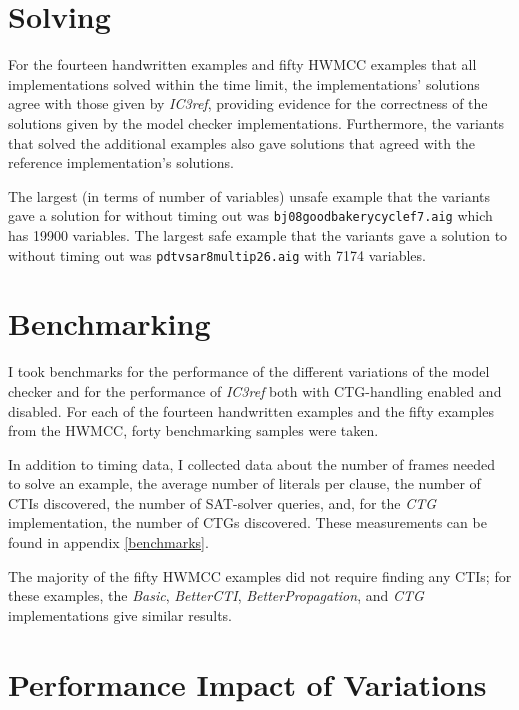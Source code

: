 \documentclass[12pt,a4paper,twoside,openright]{report}
\begin{document}
{\section{Solving}
\label{eval:solving}

For the fourteen handwritten examples and fifty HWMCC examples that all implementations solved
within the time limit, the
implementations' solutions agree with those given by \emph{IC3ref}, providing evidence for the correctness of the solutions given by the model checker
implementations. Furthermore, the variants that solved the additional examples also gave
solutions that agreed with the reference implementation's solutions.

The largest (in terms of number of variables) unsafe example that the variants gave a solution
for without timing out was \verb,bj08goodbakerycyclef7.aig, which has 19900 variables.
The largest safe example that the variants gave a solution
to without timing out was \verb,pdtvsar8multip26.aig, with 7174 variables.

\section{Benchmarking}
\label{eval:benchmarking}
I took benchmarks for the performance of the different variations of the model checker and for the
performance of \emph{IC3ref} both with CTG-handling enabled and disabled. For each of the fourteen handwritten examples and the fifty examples from the HWMCC, forty benchmarking samples were taken.

In addition to timing data, I collected data about the number of frames needed to solve an example,
the average number of literals per clause, the number of CTIs discovered, the number of SAT-solver queries,
and, for the \emph{CTG} implementation, the number of CTGs discovered. These measurements can be found in
appendix \ref{benchmarks}.

The majority of the fifty HWMCC examples did not require finding any
CTIs; for these examples, the \emph{Basic}, \emph{BetterCTI}, \emph{BetterPropagation},
and \emph{CTG} implementations give similar results. 

\section{Performance Impact of Variations}
\label{eval:variants}

}
\end{document}
